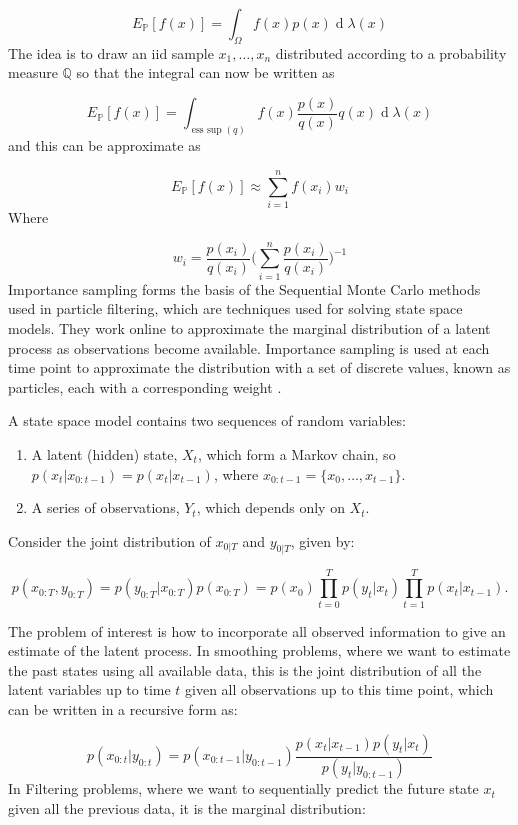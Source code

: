 \documentclass[11pt,a4paper]{article}
\renewcommand{\d}[1]{\ensuremath{\operatorname{d}\!{#1}}}
\DeclareMathOperator*{\esssup}{ess~sup}
\begin{document}
\[
E_{\mathbb{P}} [ f(x) ] = \int_{\Omega} f(x)p(x)\d \lambda (x)
\]
The idea is to draw an iid sample $x_1, \dots, x_n$ distributed according to a probability measure $\mathbb{Q}$ so that the integral can now be written as

\[
E_{\mathbb{P}} [ f(x) ] = \int_{\esssup(q)} f(x) \frac{p(x)}{q(x)} q(x) \d \lambda (x)
\]
and this can be approximate as

\[
E_{\mathbb{P}} [ f(x) ] \approx \sum_{i = 1}^{n} f(x_i) w_i
\]
Where 

\[
w_i = \frac{p(x_i)}{q(x_i)} \Bigg ( \sum_{i = 1}^{n} \frac{p(x_i)}{q(x_i)}\Bigg)^{-1}
\]
Importance sampling forms the basis of the Sequential Monte Carlo methods used in particle filtering, which are techniques used for solving state space models.
They work online to approximate the marginal distribution of a latent process as observations become available. Importance sampling is used at each time point to approximate the distribution with a set of discrete values, known as particles, each with a corresponding weight \cite{Turner}.

A state space model contains two sequences of random variables:

\begin{enumerate}
	\item A latent (hidden) state, $X_t$, which form a Markov chain, so $p(x_t | x_{0 : t - 1}) = p(x_t | x_{t - 1})$, where $x_{0 : t - 1} = \{ x_0, \dots, x_{t -1}\}$.
	\item A series of observations, $Y_t$, which depends only on $X_t$.
\end{enumerate}

Consider the joint distribution of $x_{0 | T}$ and $y_{0 | T}$, given by:

\[
p(x_{0 : T}, y_{0 : T}) = p(y_{0 : T} | x_{0 : T}) p(x_{0 : T}) = p(x_0) \prod_{t = 0}^T p(y_t | x_{t}) \prod_{t = 1}^T p(x_t | x_{t - 1}).
\]

The problem of interest is how to incorporate all observed information to give an estimate of the latent process. In smoothing problems, where we want to estimate the past states using all available data, this is the joint distribution of all the latent variables up to time $t$ given all observations up to this time point, which can be written in a recursive form as:


\[
p(x_{0 : t} | y_{0 : t}) = p(x_{0 : t - 1} | y_{0 : t - 1}) \frac{ p(x_{t} | x_{t - 1}) p(y_{t} | x_{t})}{p(y_{t} | y_{0 : t - 1})}
\]
In Filtering problems, where we want to sequentially predict the future state $x_t$ given all the previous data, it is the marginal distribution:
\end{document}
